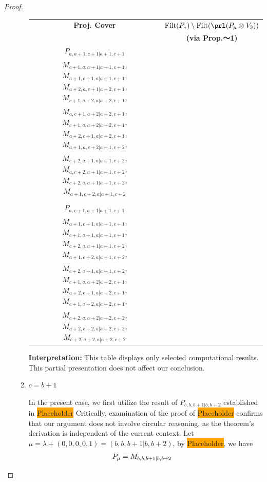 \begin{proof}
\begin{enumerate}
\begin{enumerate}
\begin{table}[htbp]
\begin{tabular}{cc}
\toprule
\textbf{Proj. Cover} & \textbf{$\operatorname{Filt}(P_*) \setminus \operatorname{Filt}(\prl(P_\mu \otimes V_{3})) $}  \\
     & \textbf{(via Prop.～1)}  \\
\midrule
 $P_{a,a+1,c+1|a+1,c+1}$ & \makecell{
 $M_{a,a+2,c+1|a+2,c+1}$,
 $M_{a,a+1,c+2|a+1,c+2}$,
 $M_{a+1,a,c+1|a+1,c+1}$,
 $M_{c+1,a+1,a|a+1,c+1}$, \\
 $M_{c+1,a,a+1|a+1,c+1}$,
 $M_{a+1,c+1,a|a+1,c+1}$,
 $M_{a+2,a,c+1|a+2,c+1}$,
 $M_{c+1,a+2,a|a+2,c+1}$, \\
 $M_{a,c+1,a+2|a+2,c+1}$,
 $M_{c+1,a,a+2|a+2,c+1}$,
 $M_{a+2,c+1,a|a+2,c+1}$,
 $M_{a+1,a,c+2|a+1,c+2}$, \\
 $M_{c+2,a+1,a|a+1,c+2}$,
 $M_{a,c+2,a+1|a+1,c+2}$,
 $M_{c+2,a,a+1|a+1,c+2}$,
 $M_{a+1,c+2,a|a+1,c+2}$
}\\
 & \\
 $P_{a,c+1,a+1|a+1,c+1}$ & \makecell{
 $M_{a,c+2,a+1|a+1,c+2}$,
 $M_{a,c+1,a+2|a+2,c+1}$,
 $M_{a,c+2,a+2|a+2,c+2}$,
 $M_{c+1,a,a+1|a+1,c+1}$, \\
 $M_{a+1,c+1,a|a+1,c+1}$,
 $M_{c+1,a+1,a|a+1,c+1}$,
 $M_{c+2,a,a+1|a+1,c+2}$,
 $M_{a+1,c+2,a|a+1,c+2}$, \\
 $M_{c+2,a+1,a|a+1,c+2}$,
 $M_{c+1,a,a+2|a+2,c+1}$,
 $M_{a+2,c+1,a|a+2,c+1}$,
 $M_{c+1,a+2,a|a+2,c+1}$, \\
 $M_{c+2,a,a+2|a+2,c+2}$,
 $M_{a+2,c+2,a|a+2,c+2}$,
 $M_{c+2,a+2,a|a+2,c+2}$
}\\
\bottomrule
\end{tabular}
\vspace{0.5em}
\parbox{\linewidth}{\small
\textbf{Interpretation:}
This table displays only selected computational results. This partial presentation does not affect our conclusion.
}
\end{table}
      \item $c=b+1$ \par
        In the present case, we first utilize the result of $P_{b,b,b+1|b,b+2}$ established in \colorbox{orange}{Placeholder} Critically, examination of the proof of \colorbox{orange}{Placeholder} confirms that our argument does not involve circular reasoning, as the theorem's derivation is independent of the current context. Let $\mu = \lambda + (0,0,0,0,1) =(b,b,b+1|b,b+2) $, by \colorbox{orange}{Placeholder}, we have
        \begin{equation}\notag
          \begin{aligned}
            P_\mu &= M_{b,b,b+1|b,b+2}

\end{aligned}
\end{equation}
\end{enumerate}
\end{enumerate}
\end{proof}
